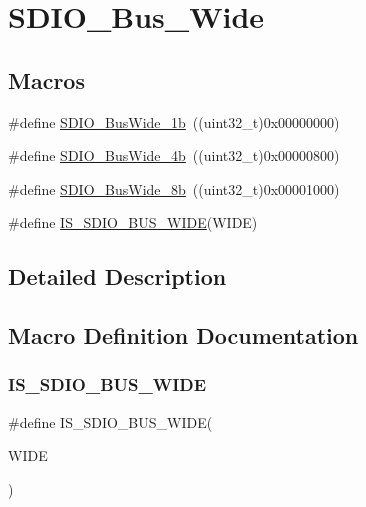 \hypertarget{group___s_d_i_o___bus___wide}{}\section{S\+D\+I\+O\+\_\+\+Bus\+\_\+\+Wide}
\label{group___s_d_i_o___bus___wide}
\subsection*{Macros}
\begin{DoxyCompactItemize}
\item 
\#define \mbox{\hyperlink{group___s_d_i_o___bus___wide_ga9c333b57937c5cc0a173a58519f9250a}{S\+D\+I\+O\+\_\+\+Bus\+Wide\+\_\+1b}}~((uint32\+\_\+t)0x00000000)
\item 
\#define \mbox{\hyperlink{group___s_d_i_o___bus___wide_ga79815d1d798b28a2d3750ad25466ff1b}{S\+D\+I\+O\+\_\+\+Bus\+Wide\+\_\+4b}}~((uint32\+\_\+t)0x00000800)
\item 
\#define \mbox{\hyperlink{group___s_d_i_o___bus___wide_ga4d864f5c4e1af298146afc1d680081e9}{S\+D\+I\+O\+\_\+\+Bus\+Wide\+\_\+8b}}~((uint32\+\_\+t)0x00001000)
\item 
\#define \mbox{\hyperlink{group___s_d_i_o___bus___wide_gaa5c6ad922117d5df3213631bf68fde5b}{I\+S\+\_\+\+S\+D\+I\+O\+\_\+\+B\+U\+S\+\_\+\+W\+I\+DE}}(W\+I\+DE)
\end{DoxyCompactItemize}


\subsection{Detailed Description}


\subsection{Macro Definition Documentation}
\mbox{\label{group___s_d_i_o___bus___wide_gaa5c6ad922117d5df3213631bf68fde5b}} 
\subsubsection{\texorpdfstring{IS\_SDIO\_BUS\_WIDE}{IS\_SDIO\_BUS\_WIDE}}
{\footnotesize\ttfamily \#define I\+S\+\_\+\+S\+D\+I\+O\+\_\+\+B\+U\+S\+\_\+\+W\+I\+DE(\begin{DoxyParamCaption}\item[{}]{W\+I\+DE }\end{DoxyParamCaption})}

